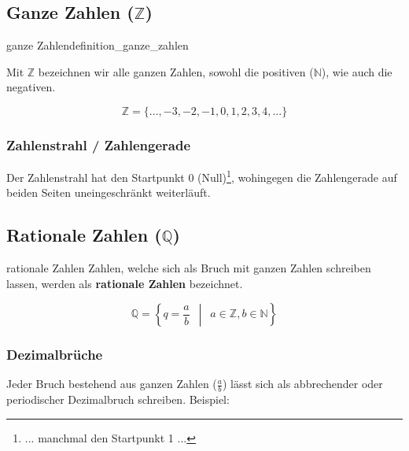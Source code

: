 \subsection{Ganze Zahlen ($\mathbb{Z}$)}
\begin{definition}{ganze Zahlen}{definition_ganze_zahlen}

  Mit $\mathbb{Z}$ bezeichnen wir alle ganzen Zahlen, sowohl die
  positiven ($\mathbb{N}$), wie auch die negativen.
  \end{definition}

$$\mathbb{Z} = \{..., -3, -2, -1, 0, 1, 2, 3,  4, ... \}$$

\subsubsection{Zahlenstrahl / Zahlengerade}

\begin{center}
\end{center}

Der Zahlenstrahl hat den Startpunkt 0 (Null)\footnote{... manchmal  den Startpunkt 1 ...}, wohingegen die
Zahlengerade auf beiden Seiten uneingeschränkt weiterläuft.

\subsection{Rationale Zahlen ($\mathbb{Q}$)}

\begin{definition}{rationale Zahlen}{}
Zahlen, welche sich als Bruch mit ganzen Zahlen schreiben lassen,
werden als \textbf{rationale Zahlen} bezeichnet.


$$\mathbb{Q} =\left\{ q = \frac{a}{b} \,\,\, \middle| \,\,\, a \in \mathbb{Z}, b \in \mathbb{N}\right\}$$
\end{definition}

\subsubsection{Dezimalbrüche}
Jeder Bruch bestehend aus ganzen Zahlen ($\frac{a}{b}$) lässt sich als
abbrechender oder periodischer Dezimalbruch schreiben. Beispiel:

